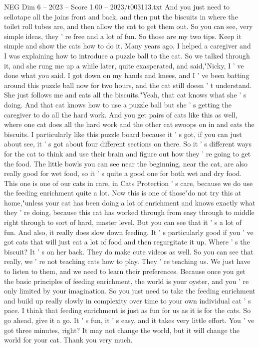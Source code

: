 \begin{textsample}{NEG Dim 6 – 2023 – Score 1.00 – 2023/t003113.txt}
And you just need to sellotape all the joins front and back, and then put the biscuits in where the toilet roll tubes are, and then allow the cat to get them out.
So you can see, very simple ideas, they ' re free and a lot of fun.
So those are my two tips.
Keep it simple and show the cats how to do it.
Many years ago, I helped a caregiver and I was explaining how to introduce a puzzle ball to the cat.
So we talked through it, and she rung me up a while later, quite exasperated, and said,"Nicky, I ' ve done what you said.
I got down on my hands and knees, and I ' ve been batting around this puzzle ball now for two hours, and the cat still doesn ' t understand.
She just follows me and eats all the biscuits."Yeah, that cat knows what she ' s doing.
And that cat knows how to use a puzzle ball but she ' s getting the caregiver to do all the hard work.
And you get pairs of cats like this as well, where one cat does all the hard work and the other cat swoops on in and eats the biscuits.
I particularly like this puzzle board because it ' s got, if you can just about see, it ' s got about four different sections on there.
So it ' s different ways for the cat to think and use their brain and figure out how they ' re going to get the food.
The little bowls you can see near the beginning, near the cat, are also really good for wet food, so it ' s quite a good one for both wet and dry food.
This one is one of our cats in care, in Cats Protection ' s care, because we do use the feeding enrichment quite a lot.
Now this is one of those"do not try this at home,"unless your cat has been doing a lot of enrichment and knows exactly what they ' re doing, because this cat has worked through from easy through to middle right through to sort of hard, master level.
But you can see that it ' s a lot of fun.
And also, it really does slow down feeding.
It ' s particularly good if you ' ve got cats that will just eat a lot of food and then regurgitate it up.
Where ' s the biscuit?
It ' s on her back.
They do make cute videos as well.
So you can see that really, we ' re not teaching cats how to play.
They ' re teaching us.
We just have to listen to them, and we need to learn their preferences.
Because once you get the basic principles of feeding enrichment, the world is your oyster, and you ' re only limited by your imagination.
So you just need to take the feeding enrichment and build up really slowly in complexity over time to your own individual cat ' s pace.
I think that feeding enrichment is just as fun for us as it is for the cats.
So go ahead, give it a go.
It ' s fun, it ' s easy, and it takes very little effort.
You ' ve got three minutes, right?
It may not change the world, but it will change the world for your cat.
Thank you very much.

\end{textsample}
